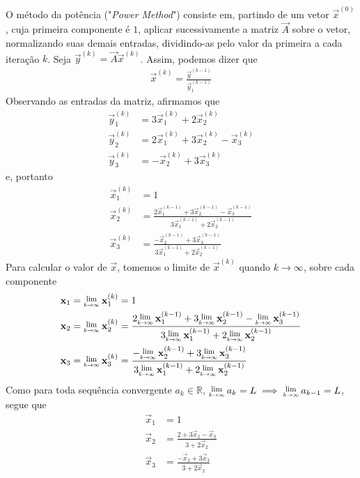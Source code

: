 \documentclass{homework}
\begin{document}
		\subsubquest O método da potência ("\textit{Power Method}") consiste em, partindo de um vetor $\vec{x}^{(0)}$, cuja primeira componente é $1$, aplicar sucessivamente a matriz $\vec{A}$ sobre o vetor, normalizando suas demais entradas, dividindo-as pelo valor da primeira a cada iteração $k$. Seja $\vec{y}^{(k)} = \vec{A} \vec{x}^{(k)}$. Assim, podemos dizer que
			\begin{align*}
				\vec{x}^{(k)} = \frac{\vec{y}^{(k-1)}}{\vec{y}_1^{(k-1)}}
			\end{align*}
		Observando as entradas da matriz, afirmamos que
			\begin{align*}
				\vec{y}_1^{(k)} &= 3 \vec{x}_1^{(k)} + 2 \vec{x}_2^{(k)}\\
				\vec{y}_2^{(k)} &= 2 \vec{x}_1^{(k)} + 3 \vec{x}_2^{(k)} - \vec{x}_3^{(k)}\\
				\vec{y}_3^{(k)} &= - \vec{x}_2^{(k)} + 3 \vec{x}_3^{(k)}
			\end{align*}
		e, portanto
			\begin{align*}
			\vec{x}_1^{(k)} &= 1\\
			\vec{x}_2^{(k)} &= \frac{2 \vec{x}_1^{(k-1)} + 3 \vec{x}_2^{(k-1)} - \vec{x}_3^{(k-1)}}{3 \vec{x}_1^{(k-1)} + 2 \vec{x}_2^{(k-1)}}\\
			\vec{x}_3^{(k)} &= \frac{- \vec{x}_2^{(k-1)} + 3 \vec{x}_3^{(k-1)}}{3 \vec{x}_1^{(k-1)} + 2 \vec{x}_2^{(k-1)}}
			\end{align*}
		Para calcular o valor de $\vec{x}$, tomemos o limite de $\vec{x}^{(k)}$ quando $k \to \infty$, sobre cada componente
			\begin{align*}
				\vec{x}_1 &= \Lim{k \to \infty} \vec{x}_1^{(k)} = 1\\
				\vec{x}_2 &= \Lim{k \to \infty} \vec{x}_2^{(k)} = \frac{2 \Lim{k \to \infty} \vec{x}_1^{(k-1)} + 3 \Lim{k \to \infty} \vec{x}_2^{(k-1)} - \Lim{k \to \infty} \vec{x}_3^{(k-1)}}{3 \Lim{k \to \infty} \vec{x}_1^{(k-1)} + 2 \Lim{k \to \infty} \vec{x}_2^{(k-1)}}\\
				\vec{x}_3 &= \Lim{k \to \infty} \vec{x}_3^{(k)} = \frac{- \Lim{k \to \infty} \vec{x}_2^{(k-1)} + 3 \Lim{k \to \infty} \vec{x}_3^{(k-1)}}{3 \Lim{k \to \infty} \vec{x}_1^{(k-1)} + 2 \Lim{k \to \infty} \vec{x}_2^{(k-1)}}
			\end{align*}
		Como para toda sequência convergente $a_k \in \mathbb{R}$, $\Lim{k \to \infty} a_k = L \implies \Lim{k \to \infty} a_{k - 1} = L$, segue que
			\begin{align*}
				\vec{x}_1 &= 1\\
				\vec{x}_2 &= \frac{2 + 3 \vec{x}_2 - \vec{x}_3}{3 + 2 \vec{x}_2}\\
				\vec{x}_3 &= \frac{- \vec{x}_2 + 3  \vec{x}_3}{3 + 2 \vec{x}_2}
			\end{align*}
\end{document}
